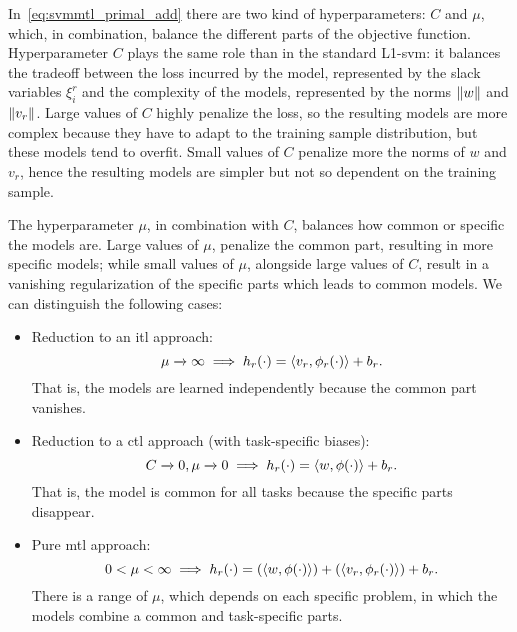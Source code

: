 %
In~\eqref{eq:svmmtl_primal_add} there are two kind of hyperparameters: $C$ and $\mu$, which, in combination, balance the different parts of the objective function. 
%
Hyperparameter $C$ plays the same role than in the standard L1-\acrshort{svm}: it balances the tradeoff between the loss incurred by the model, represented by the slack variables $\xi_i^r$ and the complexity of the models, represented by the norms $\left\lVert{w}\right\rVert$ and $\left\lVert{v}_r\right\rVert$. Large values of $C$ highly penalize the loss, so the resulting models are more complex because they have to adapt to the training sample distribution, but these models tend to overfit. Small values of $C$ penalize more the norms of $w$ and $v_r$, hence the resulting models are simpler but not so dependent on the training sample.

%
The hyperparameter $\mu$, in combination with $C$, balances how common or specific the models are. 
Large values of $\mu$, penalize the common part, resulting in more specific models; while small values of $\mu$, alongside large values of $C$, result in a vanishing regularization of the specific parts which leads to common models.
We can distinguish the following cases:
\begin{itemize}
    \item Reduction to an \acrshort{itl} approach:
    $$\mu \xrightarrow[]{} \infty \implies h_r(\cdot) = \left\langle {v}_r, \phi_r(\cdot) \right\rangle + b_r .$$
    That is, the models are learned independently because the common part vanishes.
    \item Reduction to a \acrshort{ctl} approach (with task-specific biases): 
    $$C \xrightarrow[]{} 0, \mu \xrightarrow[]{} 0 \implies h_r(\cdot) = \left\langle w, \phi(\cdot) \right\rangle + b_r .$$
    That is, the model is common for all tasks because the specific parts disappear.
    \item Pure \acrshort{mtl} approach:
    $$ 0 < \mu < \infty \implies h_r(\cdot) =(\left\langle w, \phi(\cdot) \right\rangle ) + (\left\langle {v}_r, \phi_r(\cdot) \right\rangle) + b_r .$$
    There is a range of $\mu$, which depends on each specific problem, in which the models combine a common and task-specific parts.
\end{itemize}

